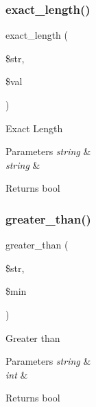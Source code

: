 \subsubsection{\texorpdfstring{exact\+\_\+length()}{exact\_length()}}
{\footnotesize\ttfamily exact\+\_\+length (\begin{DoxyParamCaption}\item[{}]{\$str,  }\item[{}]{\$val }\end{DoxyParamCaption})}

Exact Length


\begin{DoxyParams}{Parameters}
{\em string} & \\
\hline
{\em string} & \\
\hline
\end{DoxyParams}
\begin{DoxyReturn}{Returns}
bool 
\end{DoxyReturn}
\mbox{\label{class_c_i___form__validation_a8dd73c5e1d6880a650bb41e1ec6ee2f4}} 
\subsubsection{\texorpdfstring{greater\+\_\+than()}{greater\_than()}}
{\footnotesize\ttfamily greater\+\_\+than (\begin{DoxyParamCaption}\item[{}]{\$str,  }\item[{}]{\$min }\end{DoxyParamCaption})}

Greater than


\begin{DoxyParams}{Parameters}
{\em string} & \\
\hline
{\em int} & \\
\hline
\end{DoxyParams}
\begin{DoxyReturn}{Returns}
bool 
\end{DoxyReturn}
\mbox{\label{class_c_i___form__validation_a003319a504eca3e9d1b608f8e48f2daf}} 
